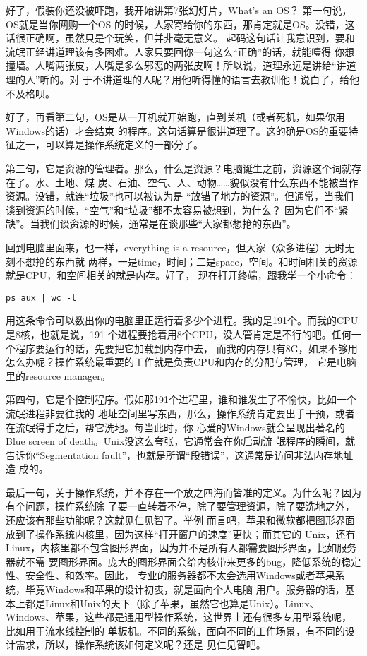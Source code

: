 \documentclass{wx672ctexart} [NO-DEFAULT-PACKAGES] \usepackage{wx672hyperref}
\begin{document}
好了，假装你还没被吓跑，我开始讲第7张幻灯片，What's an OS？ 第一句说，OS就是当你网购一个OS
的时候，人家寄给你的东西，那肯定就是OS。没错，这话很正确啊，虽然只是个玩笑，但并非毫无意义。
起码这句话让我意识到，要和流氓正经讲道理该有多困难。人家只要回你一句这么“正确”的话，就能噎得
你想撞墙。人嘴两张皮，人嘴是多么邪恶的两张皮啊！所以说，道理永远是讲给“讲道理的人”听的。对
于不讲道理的人呢？用他听得懂的语言去教训他！说白了，给他不及格呗。

好了，再看第二句，OS是从一开机就开始跑，直到关机（或者死机，如果你用Windows的话）才会结束
的程序。这句话算是很讲道理了。这的确是OS的重要特征之一，可以算是操作系统定义的一部分了。

第三句，它是资源的管理者。那么，什么是资源？电脑诞生之前，资源这个词就存在了。水、土地、煤
炭、石油、空气、人、动物……貌似没有什么东西不能被当作资源。没错，就连“垃圾”也可以被认为是
“放错了地方的资源”。但通常，当我们谈到资源的时候，“空气”和“垃圾”都不太容易被想到，为什么？
因为它们不“紧缺”。当我们谈资源的时候，通常是在谈那些“大家都想抢的东西”。

回到电脑里面来，也一样，everything is a resource，但大家（众多进程）无时无刻不想抢的东西就
两样，一是time，时间；二是space，空间。和时间相关的资源就是CPU，和空间相关的就是内存。好了，
现在打开终端，跟我学一个小命令：

\begin{verbatim}
ps aux | wc -l
\end{verbatim}

用这条命令可以数出你的电脑里正运行着多少个进程。我的是191个。而我的CPU是8核，也就是说，191
个进程要抢着用8个CPU，没人管肯定是不行的吧。任何一个程序要运行的话，先要把它加载到内存中去，
而我的内存只有8G，如果不够用怎么办呢？操作系统最重要的工作就是负责CPU和内存的分配与管理，
它是电脑里的resource manager。

第四句，它是个控制程序。假如那191个进程里，谁和谁发生了不愉快，比如一个流氓进程非要往我的
地址空间里写东西，那么，操作系统肯定要出手干预，或者在流氓得手之后，帮它洗地。每当此时，你
心爱的Windows就会呈现出著名的Blue screen of death。Unix没这么夸张，它通常会在你启动流
氓程序的瞬间，就告诉你“Segmentation fault”，也就是所谓“段错误”，这通常是访问非法内存地址造
成的。

最后一句，关于操作系统，并不存在一个放之四海而皆准的定义。为什么呢？因为有个问题，操作系统除
了要一直转着不停，除了要管理资源，除了要洗地之外，还应该有那些功能呢？这就见仁见智了。举例
而言吧，苹果和微软都把图形界面放到了操作系统内核里，因为这样“打开窗户的速度”更快；而其它的
Unix，还有Linux，内核里都不包含图形界面，因为并不是所有人都需要图形界面，比如服务器就不需
要图形界面。庞大的图形界面会给内核带来更多的bug，降低系统的稳定性、安全性、和效率。因此，
专业的服务器都不太会选用Windows或者苹果系统，毕竟Windows和苹果的设计初衷，就是面向个人电脑
用户。服务器的话，基本上都是Linux和Unix的天下（除了苹果，虽然它也算是Unix）。Linux、
Windows、苹果，这些都是通用型操作系统，这世界上还有很多专用型系统呢，比如用于流水线控制的
单板机。不同的系统，面向不同的工作场景，有不同的设计需求，所以，操作系统该如何定义呢？还是
见仁见智吧。
\end{document}
